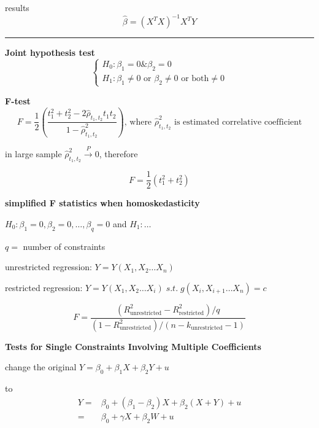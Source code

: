 \documentclass{article}
\newcommand*\sepline{%
  \begin{center}
    \rule[1ex]{.5\textwidth}{.5pt}
  \end{center}}
\begin{document}
results
\begin{equation}
  \hat{\beta}=(X^T X)^{-1}X^T Y
\end{equation}

\sepline

\textbf{Joint hypothesis test}
\begin{equation}
  \begin{cases}
    H_0: \beta_1=0 \& \beta_2=0
    \\
    H_1: \beta_1\neq 0 \text{ or } \beta_2\neq 0\text{ or both} \neq 0 
  \end{cases}
\end{equation}


\textbf{F-test}
\begin{equation}
  F=\frac{1}{2}(\frac{t_1^2+t_2^2-2 \hat \rho_{t_1,t_2} t_1 t_2 }{1-\hat \rho_{t_1,t_2}^2}) \text{, where $\hat\rho_{t_1,t_2}^2$ is estimated correlative coefficient}
\end{equation}

in large sample $\hat\rho_{t_1,t_2}^2 \stackrel{P}{\rightarrow} 0$, therefore

\begin{equation}
  F=\frac{1}{2}(t_1^2+t_2^2)
\end{equation}

\textbf{simplified F statistics when homoskedasticity}

$H_0: \beta_1=0,\beta_2=0,\dots,\beta_q=0$ and $H_1: \dots$

$q=$ number of constraints

unrestricted regression: $Y=Y(X_1,X_2\dots X_n)$

restricted regression: $Y=Y(X_1,X_2\dots X_i) \;s.t. \; g(X_i,X_{i+1}\dots X_n)=c$

\begin{equation}
  F=
  \frac{(R^2_{\text{unrestricted}}-R^2_{\text{restricted}})/q}{(1-R^2_{\text{unrestricted}})/(n-k_{\text{unrestricted}}-1)}
\end{equation}


\textbf{Tests for Single Constraints Involving Multiple Coefficients}

change the original
$Y=\beta_{0}+\beta_{1}X+\beta_{2}Y+u$ 

to
\begin{equation}
\begin{split}
  Y=&\beta_{0}+(\beta_1- \beta_{2})X+\beta_2 (X+Y)+u\\
  =&\beta_{0}+\gamma X +\beta_2 W+u
\end{split}
\end{equation}
\end{document}
